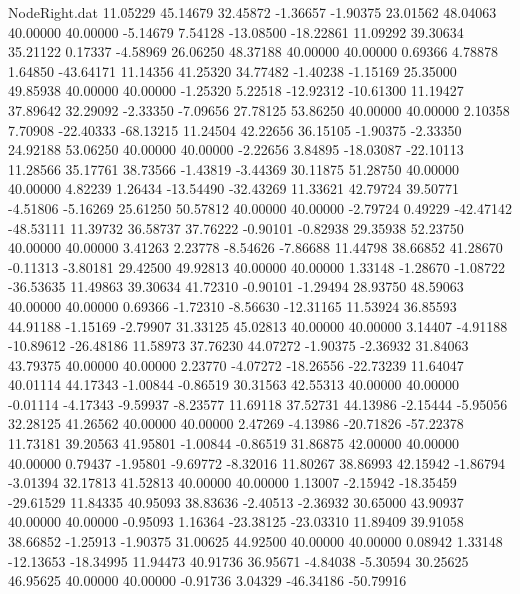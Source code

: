\begin{filecontents}{NodeRight.dat}
  11.05229   45.14679   32.45872    -1.36657   -1.90375   23.01562   48.04063   40.00000   40.00000   -5.14679    7.54128  -13.08500  -18.22861
  11.09292   39.30634   35.21122     0.17337   -4.58969   26.06250   48.37188   40.00000   40.00000    0.69366    4.78878    1.64850  -43.64171
  11.14356   41.25320   34.77482    -1.40238   -1.15169   25.35000   49.85938   40.00000   40.00000   -1.25320    5.22518  -12.92312  -10.61300
  11.19427   37.89642   32.29092    -2.33350   -7.09656   27.78125   53.86250   40.00000   40.00000    2.10358    7.70908  -22.40333  -68.13215
  11.24504   42.22656   36.15105    -1.90375   -2.33350   24.92188   53.06250   40.00000   40.00000   -2.22656    3.84895  -18.03087  -22.10113
  11.28566   35.17761   38.73566    -1.43819   -3.44369   30.11875   51.28750   40.00000   40.00000    4.82239    1.26434  -13.54490  -32.43269
  11.33621   42.79724   39.50771    -4.51806   -5.16269   25.61250   50.57812   40.00000   40.00000   -2.79724    0.49229  -42.47142  -48.53111
  11.39732   36.58737   37.76222    -0.90101   -0.82938   29.35938   52.23750   40.00000   40.00000    3.41263    2.23778   -8.54626   -7.86688
  11.44798   38.66852   41.28670    -0.11313   -3.80181   29.42500   49.92813   40.00000   40.00000    1.33148   -1.28670   -1.08722  -36.53635
  11.49863   39.30634   41.72310    -0.90101   -1.29494   28.93750   48.59063   40.00000   40.00000    0.69366   -1.72310   -8.56630  -12.31165
  11.53924   36.85593   44.91188    -1.15169   -2.79907   31.33125   45.02813   40.00000   40.00000    3.14407   -4.91188  -10.89612  -26.48186
  11.58973   37.76230   44.07272    -1.90375   -2.36932   31.84063   43.79375   40.00000   40.00000    2.23770   -4.07272  -18.26556  -22.73239
  11.64047   40.01114   44.17343    -1.00844   -0.86519   30.31563   42.55313   40.00000   40.00000   -0.01114   -4.17343   -9.59937   -8.23577
  11.69118   37.52731   44.13986    -2.15444   -5.95056   32.28125   41.26562   40.00000   40.00000    2.47269   -4.13986  -20.71826  -57.22378
  11.73181   39.20563   41.95801    -1.00844   -0.86519   31.86875   42.00000   40.00000   40.00000    0.79437   -1.95801   -9.69772   -8.32016
  11.80267   38.86993   42.15942    -1.86794   -3.01394   32.17813   41.52813   40.00000   40.00000    1.13007   -2.15942  -18.35459  -29.61529
  11.84335   40.95093   38.83636    -2.40513   -2.36932   30.65000   43.90937   40.00000   40.00000   -0.95093    1.16364  -23.38125  -23.03310
  11.89409   39.91058   38.66852    -1.25913   -1.90375   31.00625   44.92500   40.00000   40.00000    0.08942    1.33148  -12.13653  -18.34995
  11.94473   40.91736   36.95671    -4.84038   -5.30594   30.25625   46.95625   40.00000   40.00000   -0.91736    3.04329  -46.34186  -50.79916

\end{filecontents}
